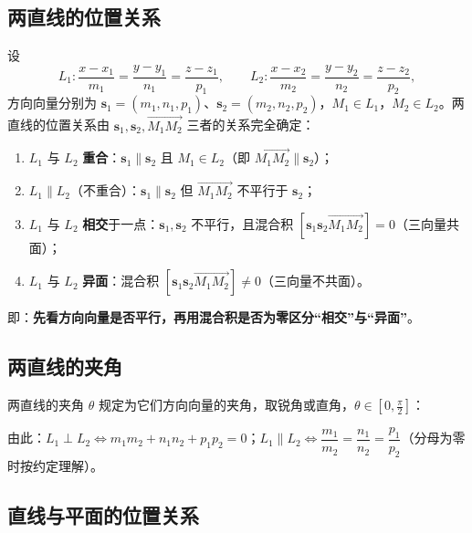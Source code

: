 \subsection{两直线的位置关系}

设
\[
L_1:\frac{x-x_1}{m_1}=\frac{y-y_1}{n_1}=\frac{z-z_1}{p_1},\qquad
L_2:\frac{x-x_2}{m_2}=\frac{y-y_2}{n_2}=\frac{z-z_2}{p_2},
\]
方向向量分别为 $\boldsymbol{s}_1=(m_1,n_1,p_1)$、$\boldsymbol{s}_2=(m_2,n_2,p_2)$，$M_1\in L_1$，$M_2\in L_2$。两直线的位置关系由 $\boldsymbol{s}_1,\boldsymbol{s}_2,\overrightarrow{M_1M_2}$ 三者的关系完全确定：

\begin{enumerate}
\item $L_1$ 与 $L_2$ \textbf{重合}：$\boldsymbol{s}_1\parallel\boldsymbol{s}_2$ 且 $M_1\in L_2$（即 $\overrightarrow{M_1M_2}\parallel\boldsymbol{s}_2$）；
\item $L_1\parallel L_2$（不重合）：$\boldsymbol{s}_1\parallel\boldsymbol{s}_2$ 但 $\overrightarrow{M_1M_2}$ 不平行于 $\boldsymbol{s}_2$；
\item $L_1$ 与 $L_2$ \textbf{相交}于一点：$\boldsymbol{s}_1,\boldsymbol{s}_2$ 不平行，且混合积 $[\boldsymbol{s}_1\boldsymbol{s}_2\overrightarrow{M_1M_2}]=0$（三向量共面）；
\item $L_1$ 与 $L_2$ \textbf{异面}：混合积 $[\boldsymbol{s}_1\boldsymbol{s}_2\overrightarrow{M_1M_2}]\neq0$（三向量不共面）。
\end{enumerate}

即：\textbf{先看方向向量是否平行，再用混合积是否为零区分“相交”与“异面”}。

\subsection{两直线的夹角}

两直线的夹角 $\theta$ 规定为它们方向向量的夹角，取锐角或直角，$\theta\in\left[0,\frac{\pi}{2}\right]$：


由此：$L_1\perp L_2\iff m_1m_2+n_1n_2+p_1p_2=0$；$L_1\parallel L_2\iff\dfrac{m_1}{m_2}=\dfrac{n_1}{n_2}=\dfrac{p_1}{p_2}$（分母为零时按约定理解）。

\subsection{直线与平面的位置关系}


